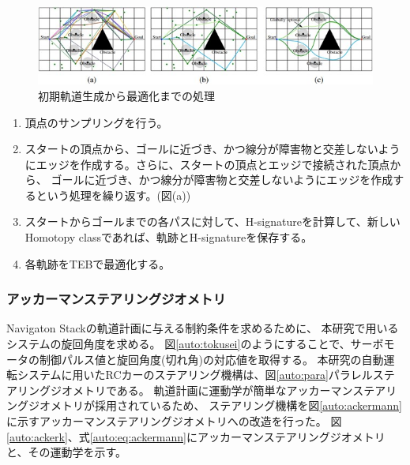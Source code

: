\begin{enumerate}
\begin{figure}[h]
  \begin{center}
    \includegraphics[width=\linewidth]{img/auto_32.jpg}
    \caption{初期軌道生成から最適化までの処理}
    \label{auto:teb:seisei}
  \end{center}
\end{figure}
\begin{enumerate}
  \item 頂点のサンプリングを行う。
  \item スタートの頂点から、ゴールに近づき、かつ線分が障害物と交差しないようにエッジを作成する。さらに、スタートの頂点とエッジで接続された頂点から、
  ゴールに近づき、かつ線分が障害物と交差しないようにエッジを作成するという処理を繰り返す。(図(a))
  \item スタートからゴールまでの各パスに対して、H-signatureを計算して、新しいHomotopy classであれば、軌跡とH-signatureを保存する。
  \item 各軌跡をTEBで最適化する。
\end{enumerate}
\end{enumerate}

\subsubsection{アッカーマンステアリングジオメトリ}
Navigaton Stackの軌道計画に与える制約条件を求めるために、
本研究で用いるシステムの旋回角度を求める。
図\ref{auto:tokusei}のようにすることで、サーボモータの制御パルス値と旋回角度(切れ角)の対応値を取得する。
本研究の自動運転システムに用いたRCカーのステアリング機構は、図\ref{auto:para}パラレルステアリングジオメトリである。
軌道計画に運動学が簡単なアッカーマンステアリングジオメトリが採用されているため、
ステアリング機構を図\ref{auto:ackermann}に示すアッカーマンステアリングジオメトリへの改造を行った。
図\ref{auto:ackerk}、式\eqref{auto:eq:ackermann}にアッカーマンステアリングジオメトリと、その運動学を示す。

